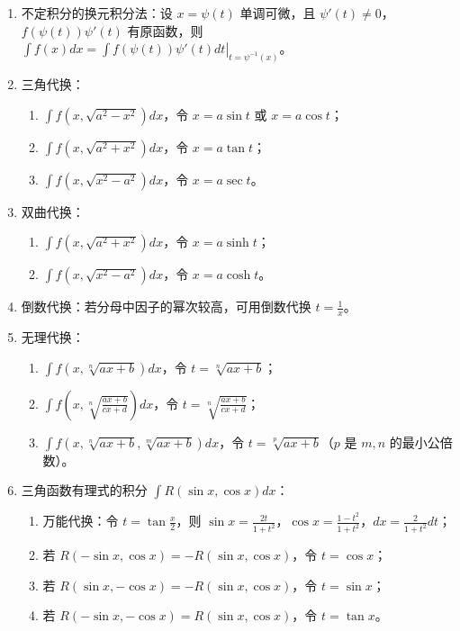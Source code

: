 \documentclass[UTF8]{ctexart}
\theoremstyle{remark}
\begin{document}
\begin{enumerate}
	\item 不定积分的换元积分法：设 \(x = \psi(t)\) 单调可微，且 \(\psi'(t) \neq 0\)，\(f(\psi(t))\psi'(t)\) 有原函数，则 \(\int f(x)dx = \left.\int f(\psi(t))\psi'(t)dt\right|_{t = \psi^{-1}(x)}\)。
	
	\item 三角代换：
	\begin{enumerate}
		\item \(\int f(x, \sqrt{a^2 - x^2})dx\)，令 \(x = a\sin t\) 或 \(x = a\cos t\)；
		\item \(\int f(x, \sqrt{a^2 + x^2})dx\)，令 \(x = a\tan t\)；
		\item \(\int f(x, \sqrt{x^2 - a^2})dx\)，令 \(x = a\sec t\)。
	\end{enumerate}
	
	\item 双曲代换：
	\begin{enumerate}
		\item \(\int f(x, \sqrt{a^2 + x^2})dx\)，令 \(x = a\sinh t\)；
		\item \(\int f(x, \sqrt{x^2 - a^2})dx\)，令 \(x = a\cosh t\)。
	\end{enumerate}
	
	\item 倒数代换：若分母中因子的幂次较高，可用倒数代换 \(t = \frac{1}{x}\)。
	
	\item 无理代换：
	\begin{enumerate}
		\item \(\int f(x, \sqrt[n]{ax + b})dx\)，令 \(t = \sqrt[n]{ax + b}\)；
		\item \(\int f(x, \sqrt[n]{\frac{ax + b}{cx + d}})dx\)，令 \(t = \sqrt[n]{\frac{ax + b}{cx + d}}\)；
		\item \(\int f(x, \sqrt[n]{ax + b}, \sqrt[m]{ax + b})dx\)，令 \(t = \sqrt[p]{ax + b}\)（\(p\) 是 \(m, n\) 的最小公倍数）。
	\end{enumerate}
	
	\item 三角函数有理式的积分 \(\int R(\sin x, \cos x)dx\)：
	\begin{enumerate}
		\item 万能代换：令 \(t = \tan\frac{x}{2}\)，则 \(\sin x = \frac{2t}{1 + t^2}\)，\(\cos x = \frac{1 - t^2}{1 + t^2}\)，\(dx = \frac{2}{1 + t^2}dt\)；
		\item 若 \(R(-\sin x, \cos x) = -R(\sin x, \cos x)\)，令 \(t = \cos x\)；
		\item 若 \(R(\sin x, -\cos x) = -R(\sin x, \cos x)\)，令 \(t = \sin x\)；
		\item 若 \(R(-\sin x, -\cos x) = R(\sin x, \cos x)\)，令 \(t = \tan x\)。
	\end{enumerate}
	

\end{enumerate}
\end{document}
